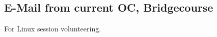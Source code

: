 \documentclass{article}
\begin{document}
	\subsection{E-Mail from current OC, Bridgecourse}
		For Linux session volunteering.
		\begin{figure}[h]
		\end{figure}
\end{document}
